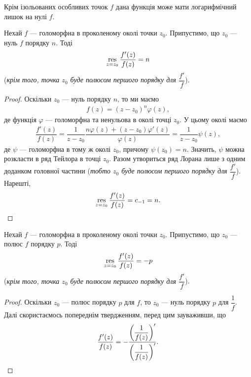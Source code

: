 \documentclass{math_library}
\begin{document}
\begin{remark}
Крім ізольованих особливих точок $f$ дана функція може мати логарифмічний лишок на нулі $f$.
\end{remark}

\begin{proposition}
Нехай $f$ --- голоморфна в проколеному околі точки $z_0$. Припустимо, що $z_0$ --- нуль $f$ порядку $n$. Тоді 
\begin{align*}
\operatorname*{res}_{z = z_0} \dfrac{f'(z)}{f(z)} = n
\end{align*}
(\textit{крім того, точка $z_0$ буде полюсом першого порядку для $\dfrac{f'}{f}$}).
\end{proposition}

\begin{proof}
Оскільки $z_0$ --- нуль порядку $n$, то ми маємо
\begin{align*}
f(z) = (z-z_0)^n \varphi(z),
\end{align*}
де функція $\varphi$ --- голоморфна та ненульова в околі точці $z_0$. У цьому околі маємо
\begin{align*}
\dfrac{f'(z)}{f(z)} = \dfrac{1}{z-z_0} \dfrac{n \varphi(z) + (z-z_0) \varphi'(z)}{\varphi(z)} = \dfrac{1}{z-z_0} \psi(z),
\end{align*} 
де $\psi$ --- голоморфна в тому ж околі $z_0$, причому $\psi(z_0) = n$. Значить, $\psi$ можна розкласти в ряд Тейлора в точці $z_0$. Разом утвориться ряд Лорана лише з одним доданком головної частини (\textit{тобто $z_0$ буде полюсом першого порядку для $\dfrac{f'}{f}$}). Нарешті,
\[
\operatorname*{res}_{z=z_0} \dfrac{f'(z)}{f(z)} = c_{-1} = n. \qedhere
\]
\end{proof}

\begin{proposition}
Нехай $f$ --- голоморфна в проколеному околі точки $z_0$. Припустимо, що $z_0$ --- полюс $f$ порядку $p$. Тоді 
\begin{align*}
\operatorname*{res}_{z = z_0} \dfrac{f'(z)}{f(z)} = -p
\end{align*}
(\textit{крім того, точка $z_0$ буде полюсом першого порядку для $\dfrac{f'}{f}$}).
\end{proposition}

\begin{proof}
Оскільки $z_0$ --- полюс порядку $p$ для $f$, то $z_0$ --- нуль порядку $p$ для $\dfrac{1}{f}$. Далі скористаємось попереднім твердженням, перед цим зауваживши, що
\[
\dfrac{f'(z)}{f(z)} = -\dfrac{\left( \dfrac{1}{f(z)} \right)'}{\left( \dfrac{1}{f(z)} \right)'}. \qedhere
\] 
\end{proof}
\end{document}
